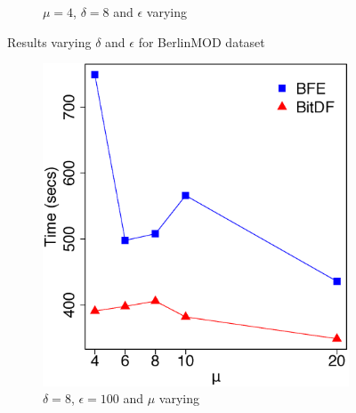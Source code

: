 \begin{figure}[h!]
\begin{subfigure}[t]{0.48\textwidth}
        \caption{$\mu = 4$, $\delta = 8$ and $\epsilon$ varying}
        \label{fig:berlinmod_vary_g}
    \end{subfigure}
    \caption{Results varying $\delta$ and $\epsilon$ for BerlinMOD dataset}
    \label{fig:berlinmod_results}
\end{figure}

\begin{figure}[h!]
    \begin{subfigure}[t]{0.48\textwidth}
        \includegraphics[width=\textwidth]{images/BerlinMOD_l_8_g_100_varying_n.eps}
        \caption{$\delta = 8$, $\epsilon = 100$ and $\mu$ varying}
        \label{fig:berlinmod_vary_n}
    \end{subfigure}
    \begin{subfigure}[t]{0.48\textwidth}

\end{subfigure}
\end{figure}
